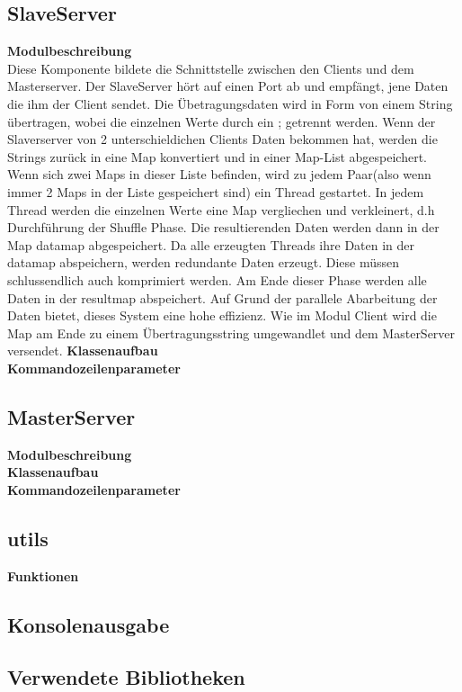 \documentclass[a4paper,12pt]{article}
\begin{document}
\subsection{SlaveServer}
\textbf{Modulbeschreibung}\\
Diese Komponente bildete die Schnittstelle zwischen den Clients und dem Masterserver. Der SlaveServer hört auf einen Port ab und empfängt, jene Daten die ihm der Client sendet. Die Übetragungsdaten wird in Form von einem String übertragen, wobei die 
einzelnen Werte durch ein ; getrennt werden. Wenn der Slaverserver von 2 unterschieldichen Clients Daten bekommen hat, werden die Strings zurück in eine Map konvertiert und in einer Map-List abgespeichert. Wenn sich zwei Maps in dieser Liste befinden, wird zu jedem Paar(also wenn immer 2 Maps in der Liste gespeichert sind)
ein Thread gestartet. In jedem Thread werden die einzelnen Werte eine Map vergliechen und verkleinert, d.h Durchführung der Shuffle Phase. Die resultierenden Daten werden dann in der Map datamap abgespeichert. Da alle erzeugten Threads ihre Daten in der datamap abspeichern, werden redundante Daten erzeugt. Diese müssen schlussendlich auch komprimiert werden. Am Ende dieser Phase werden alle Daten in der resultmap abspeichert. 
Auf Grund der parallele Abarbeitung der Daten bietet, dieses System eine hohe effizienz. Wie im Modul Client wird die Map am Ende zu einem Übertragungsstring umgewandlet und dem MasterServer versendet.
\textbf{Klassenaufbau}\\
\textbf{Kommandozeilenparameter}\\
\subsection{MasterServer}
\textbf{Modulbeschreibung}\\
\textbf{Klassenaufbau}\\
\textbf{Kommandozeilenparameter}\\ 
\subsection{utils}
\textbf{Funktionen}\\
\subsection{Konsolenausgabe}
\newpage
\noindent
\subsection{Verwendete Bibliotheken}
\end{document}
